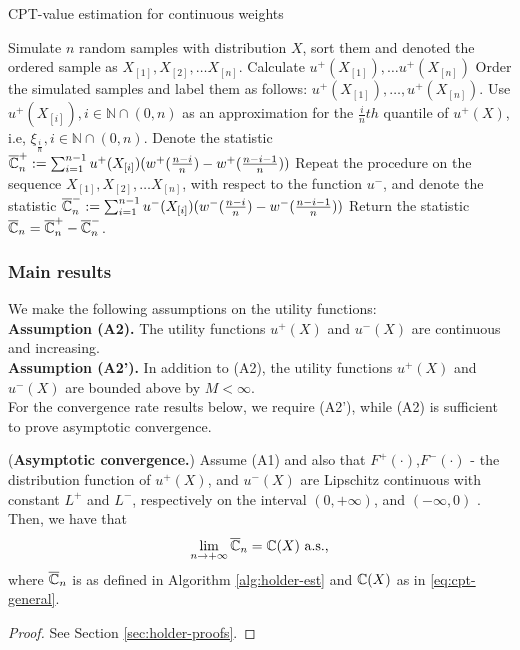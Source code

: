 \documentclass[11pt,letterpaper,english]{article}
\begin{document}

\begin{algorithm}
\caption{CPT-value estimation for \holder continuous weights}
\label{alg:holder-est}
\begin{algorithmic}[1]
\State Simulate $n$ random samples with distribution $X$, sort them and denoted the ordered sample as 
$X_{[1]}, X_{[2]}, \ldots X_{[n]}$.
\State Calculate $u^+(X_{[1]}),\ldots u^+(X_{[n]})$
\State Order the simulated samples and label them as follows: 
$u^+(X_{[1]}),\ldots,u^+(X_{[n]})$.
\State Use $u^+(X_{[i]}), i\in \mathbb{N}\cap (0,n)$ as an approximation for the $\frac{i}{n} th$ quantile of $u^+(X)$, i.e, $\xi_{\frac{i}{n}}, i\in \mathbb{N}\cap (0,n)$.
\State Denote the statistic 
$\overline {\mathbb{C}}_n^+:=\sum_{i=1}^{n-1} u^+(X_{[i]}) (w^+(\frac{n-i}{n})- w^+(\frac{n-i-1}{n}) )$
\State Repeat the procedure on the sequence $X_{[1]}, X_{[2]}, \ldots X_{[n]}$, with respect to the function $u^-$, 
and denote the statistic $\overline {\mathbb{C}}_n^-:=\sum_{i=1}^{n-1} u^-(X_{[i]}) (w^-(\frac{n-i}{n})- w^-(\frac{n-i-1}{n}) ) $
\State Return the statistic $\overline {\mathbb{C}}_n =\overline {\mathbb{C}}_n^+ - \overline {\mathbb{C}}_n^-$.
\end{algorithmic}
\end{algorithm}

\subsubsection*{Main results}
We make the following assumptions on the utility functions:\\[1ex]
\textbf{Assumption (A2).}  The utility functions $u^+(X)$ and $u^-(X)$ are continuous and increasing.\\[1ex]
\textbf{Assumption (A2').}  In addition to (A2), the utility functions $u^+(X)$ and $u^-(X)$ are bounded above by $M<\infty$.\\[1ex]
For the convergence rate results below, we require (A2'), while (A2) is sufficient to prove asymptotic convergence.

\begin{proposition}(\textbf{Asymptotic convergence.})
\label{prop:holder-asymptotic}
Assume (A1) and also that $F^+(\cdot)$,$F^-(\cdot)$ - the distribution function of $u^+(X)$, and $u^-(X)$ are Lipschitz continuous with constant $L^+$ and $L^-$, respectively on the interval $(0,+\infty)$, and 
$(-\infty, 0)$ . Then, we have that
\begin{align}
\lim_{n\rightarrow +\infty} 
\overline {\mathbb{C}}_n
=
\mathbb{C}(X)
 \text{   a.s.,}
\end{align}
where $\overline {\mathbb{C}}_n$ is as defined in Algorithm \ref{alg:holder-est} and $\mathbb{C}(X)$ as in \eqref{eq:cpt-general}.
\end{proposition}
\begin{proof}
See Section \ref{sec:holder-proofs}.
\end{proof}
\end{document}

